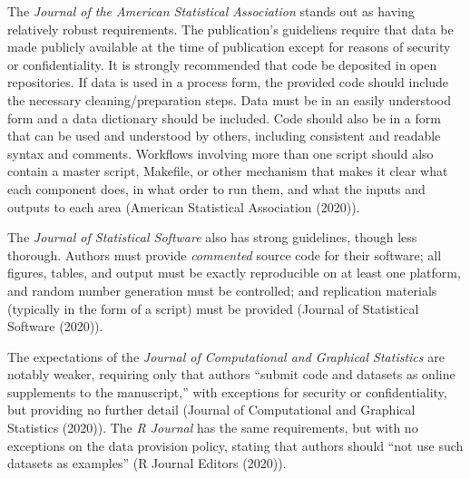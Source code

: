 \documentclass[12pt,twoside]{reedthesis}
\begin{document}
The \emph{Journal of the American Statistical Association} stands out as having relatively robust requirements. The publication's guideliens require that data be made publicly available at the time of publication except for reasons of security or confidentiality. It is strongly recommended that code be deposited in open repositories. If data is used in a process form, the provided code should include the necessary cleaning/preparation steps. Data must be in an easily understood form and a data dictionary should be included. Code should also be in a form that can be used and understood by others, including consistent and readable syntax and comments. Workflows involving more than one script should also contain a master script, Makefile, or other mechanism that makes it clear what each component does, in what order to run them, and what the inputs and outputs to each area (American Statistical Association (2020)).

The \emph{Journal of Statistical Software} also has strong guidelines, though less thorough. Authors must provide \emph{commented} source code for their software; all figures, tables, and output must be exactly reproducible on at least one platform, and random number generation must be controlled; and replication materials (typically in the form of a script) must be provided (Journal of Statistical Software (2020)).

The expectations of the \emph{Journal of Computational and Graphical Statistics} are notably weaker, requiring only that authors ``submit code and datasets as online supplements to the manuscript,'' with exceptions for security or confidentiality, but providing no further detail (Journal of Computational and Graphical Statistics (2020)). The \emph{R Journal} has the same requirements, but with no exceptions on the data provision policy, stating that authors should ``not use such datasets as examples'' (R Journal Editors (2020)).
\end{document}
